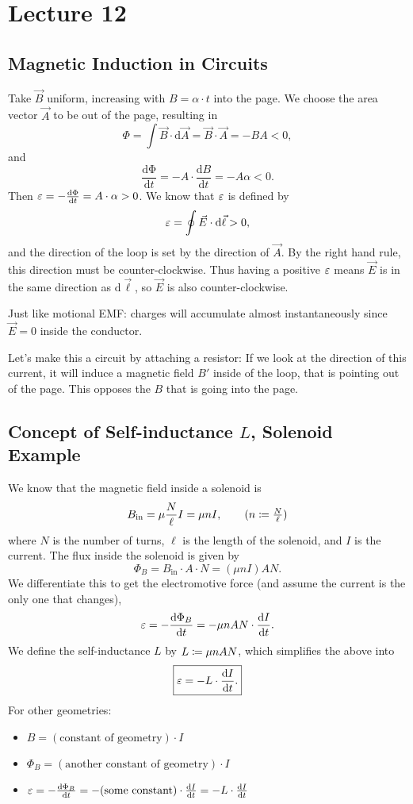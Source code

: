 \documentclass[class=article, crop=false]{standalone}
\begin{document}
  \section{Lecture 12}
  \subsection{Magnetic Induction in Circuits}
  Take $\vec{B}$ uniform, increasing with $B = \alpha\cdot t$ into the page. We choose the area vector $\vec{A}$ to be out of the page, resulting in
  \[
    \Phi = \int \vec{B}\cdot \mathrm{d}\vec{A} = \vec{B}\cdot \vec{A} = -BA < 0,
  \]
  and
  \[
    \frac{\mathrm{d\Phi}}{\mathrm{d}t} = -A\cdot \frac{\mathrm{d}B}{\mathrm{d}t} = -A\alpha < 0.
  \]
  Then $\varepsilon = -\frac{\mathrm{d\Phi}}{\mathrm{d}t} = A\cdot \alpha > 0$. We know that $\varepsilon$ is defined by
  \[
    \varepsilon = \oint \vec{E}\cdot \mathrm{d}\vec{\ell} > 0,
  \]
  and the direction of the loop is set by the direction of $\vec{A}$. By the right hand rule, this direction must be counter-clockwise. Thus having a positive $\varepsilon$ means $\vec{E}$ is in the same direction as $\mathrm{d}\vec{\ell}$, so $\vec{E}$ is also counter-clockwise.
  \begin{note}{}
    Just like motional EMF: charges will accumulate almost instantaneously since $\vec{E} = 0$ inside the conductor.
  \end{note}
  Let's make this a circuit by attaching a resistor:
  If we look at the direction of this current, it will induce a magnetic field $B'$ inside of the loop, that is pointing out of the page. This opposes the $B$ that is going into the page.
  \subsection{Concept of Self-inductance $L$, Solenoid Example}
  We know that the magnetic field inside a solenoid is
  \[
    B_\text{in} = \mu \frac{N}{\ell}I = \mu nI, \tag{$n\ceq \frac{N}{\ell}$}
  \]
  where $N$ is the number of turns, $\ell$ is the length of the solenoid, and $I$ is the current. The flux inside the solenoid is given by
  \[
    \Phi_B = B_\text{in}\cdot A\cdot N = (\mu nI)AN.
  \]
  We differentiate this to get the electromotive force (and assume the current is the only one that changes), 
  \[
    \varepsilon = -\frac{\mathrm{d}\Phi_B}{\mathrm{d}t} = -\mu nAN\cdot \frac{\mathrm{d}I}{\mathrm{d}t}.
  \]
  We define the self-inductance $L$ by $L \coloneqq \mu nAN$, which simplifies the above into
  \[
    \boxed{\varepsilon = -L\cdot \frac{\mathrm{d}I}{\mathrm{d}t}.}
  \]
  For other geometries:
  \begin{itemize}
    \item $B = (\text{constant of geometry})\cdot I$
    \item $\Phi_B = (\text{another constant of geometry})\cdot I$
    \item $\varepsilon = -\frac{\mathrm{d}\Phi_B}{\mathrm{d}t} = -(\text{some constant})\cdot \frac{\mathrm{d}I}{\mathrm{d}t} = -L\cdot \frac{\mathrm{d}I}{\mathrm{d}t}$
  \end{itemize}
\end{document}
